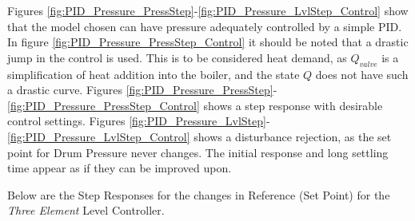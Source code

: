     Figures \ref{fig:PID_Pressure_PressStep}-\ref{fig:PID_Pressure_LvlStep_Control} show that the model chosen can have pressure adequately controlled by a simple PID. In figure \ref{fig:PID_Pressure_PressStep_Control} it should be noted that a drastic jump in the control is used. This is to be considered heat demand, as $Q_{valve}$ is a simplification of heat addition into the boiler, and the state $Q$ does not have such a drastic curve. Figures \ref{fig:PID_Pressure_PressStep}-\ref{fig:PID_Pressure_PressStep_Control} shows a step response with desirable control settings. Figures \ref{fig:PID_Pressure_LvlStep}-\ref{fig:PID_Pressure_LvlStep_Control} shows a disturbance rejection, as the set point for Drum Pressure never changes. The initial response and long settling time appear as if they can be improved upon.
    
    
    \clearpage
    
    Below are the Step Responses for the changes in Reference (Set Point) for the \textit{Three Element} Level Controller.
    

